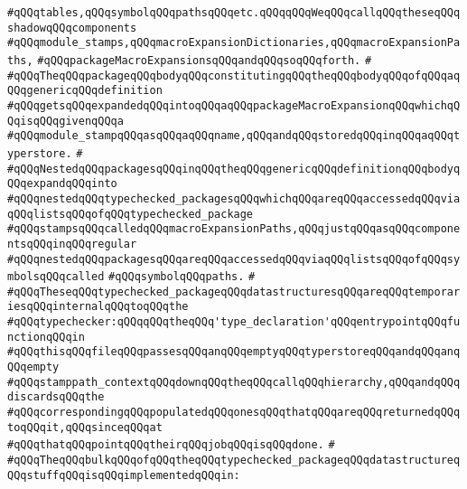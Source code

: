 \verb|#qQQqtables,qQQqsymbolqQQqpathsqQQqetc.qQQqqQQqWeqQQqcallqQQqtheseqQQqshadowqQQqcomponents|\newline
\verb|#qQQqmodule_stamps,qQQqmacroExpansionDictionaries,qQQqmacroExpansionPaths,|\newline
\verb|#qQQqpackageMacroExpansionsqQQqandqQQqsoqQQqforth.|\newline
\verb|#|\newline
\verb|#qQQqTheqQQqpackageqQQqbodyqQQqconstitutingqQQqtheqQQqbodyqQQqofqQQqaqQQqgenericqQQqdefinition|\newline
\verb|#qQQqgetsqQQqexpandedqQQqintoqQQqaqQQqpackageMacroExpansionqQQqwhichqQQqisqQQqgivenqQQqa|\newline
\verb|#qQQqmodule_stampqQQqasqQQqaqQQqname,qQQqandqQQqstoredqQQqinqQQqaqQQqtyperstore.|\newline
\verb|#|\newline
\verb|#qQQqNestedqQQqpackagesqQQqinqQQqtheqQQqgenericqQQqdefinitionqQQqbodyqQQqexpandqQQqinto|\newline
\verb|#qQQqnestedqQQqtypechecked_packagesqQQqwhichqQQqareqQQqaccessedqQQqviaqQQqlistsqQQqofqQQqtypechecked_package|\newline
\verb|#qQQqstampsqQQqcalledqQQqmacroExpansionPaths,qQQqjustqQQqasqQQqcomponentsqQQqinqQQqregular|\newline
\verb|#qQQqnestedqQQqpackagesqQQqareqQQqaccessedqQQqviaqQQqlistsqQQqofqQQqsymbolsqQQqcalled|\newline
\verb|#qQQqsymbolqQQqpaths.|\newline
\verb|#|\newline
\verb|#qQQqTheseqQQqtypechecked_packageqQQqdatastructuresqQQqareqQQqtemporariesqQQqinternalqQQqtoqQQqthe|\newline
\verb|#qQQqtypechecker:qQQqqQQqtheqQQq'type_declaration'qQQqentrypointqQQqfunctionqQQqin|\newline
\verb|#qQQqthisqQQqfileqQQqpassesqQQqanqQQqemptyqQQqtyperstoreqQQqandqQQqanqQQqempty|\newline
\verb|#qQQqstamppath_contextqQQqdownqQQqtheqQQqcallqQQqhierarchy,qQQqandqQQqdiscardsqQQqthe|\newline
\verb|#qQQqcorrespondingqQQqpopulatedqQQqonesqQQqthatqQQqareqQQqreturnedqQQqtoqQQqit,qQQqsinceqQQqat|\newline
\verb|#qQQqthatqQQqpointqQQqtheirqQQqjobqQQqisqQQqdone.|\newline
\verb|#|\newline
\verb|#qQQqTheqQQqbulkqQQqofqQQqtheqQQqtypechecked_packageqQQqdatastructureqQQqstuffqQQqisqQQqimplementedqQQqin:|\newline
